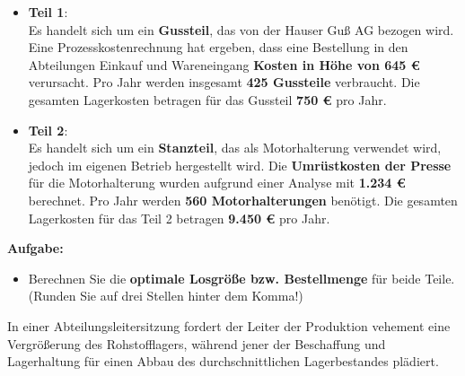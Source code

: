 \begin{itemize}
    \item \textbf{Teil 1}: \\ 
    Es handelt sich um ein \textbf{Gussteil}, das von der Hauser Gu\ss{} AG bezogen wird. Eine Prozesskostenrechnung hat ergeben, dass eine Bestellung in den Abteilungen Einkauf und Wareneingang \textbf{Kosten in H\"ohe von 645 €} verursacht. Pro Jahr werden insgesamt \textbf{425 Gussteile} verbraucht. Die gesamten Lagerkosten betragen f\"ur das Gussteil \textbf{750 €} pro Jahr.
    \item \textbf{Teil 2}: \\ 
    Es handelt sich um ein \textbf{Stanzteil}, das als Motorhalterung verwendet wird, jedoch im eigenen Betrieb hergestellt wird. Die \textbf{Umr\"ustkosten der Presse} f\"ur die Motorhalterung wurden aufgrund einer Analyse mit \textbf{1.234 €} berechnet. Pro Jahr werden \textbf{560 Motorhalterungen} ben\"otigt. Die gesamten Lagerkosten f\"ur das Teil 2 betragen \textbf{9.450  €} pro Jahr.
\end{itemize}
\noindent
\textbf{Aufgabe:}
\begin{itemize}
    \item Berechnen Sie die \textbf{optimale Losgr\"o\ss{}e bzw. Bestellmenge} f\"ur beide Teile. (Runden Sie auf drei Stellen hinter dem Komma!)
\end{itemize}



In einer Abteilungsleitersitzung fordert der Leiter der Produktion vehement eine Vergrößerung des Rohstofflagers, während jener der Beschaffung und Lagerhaltung für einen Abbau des durchschnittlichen Lagerbestandes plädiert.

